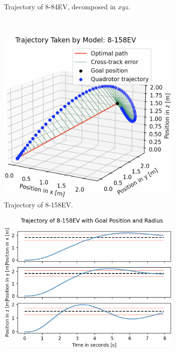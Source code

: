 \begin{figure}[H]
\begin{subfigure}[b]{0.49\textwidth}
         \caption{Trajectory of 8-84EV, decomposed in $xyz$.}
         \label{fig:testing_ppo884EV2}
     \end{subfigure} 
     \hfill \\[1mm]
    \begin{subfigure}[b]{0.48\textwidth}
         \centering
         \captionsetup{justification=centering}
         \includegraphics[width=\textwidth]{figures/5_/Testing/ppo_test_8158EV1.png}
         \caption{Trajectory of 8-158EV.}
         \label{fig:testing_ppo8158EV1}
     \end{subfigure} 
     \hfill 
     \begin{subfigure}[b]{0.49\textwidth}
         \centering
         \captionsetup{justification=centering}
         \includegraphics[width=\textwidth]{figures/5_/Testing/ppo_test_8158EV2.png}

\end{subfigure}
\end{figure}
